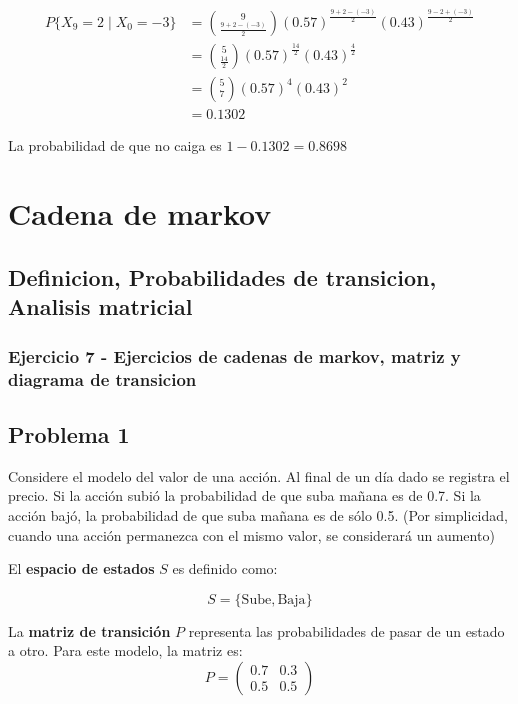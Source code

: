 \documentclass{article}
\begin{document}
\begin{align*}
    P\{X_{9} = 2 \mid X_0 = -3\} & = \binom{9}{\frac{9 + 2 -(-3)}{2}} \left(0.57\right)^{\frac{9 + 2 - (-3)}{2}} \left(0.43\right)^{\frac{9 - 2 + (-3)}{2}} \\
                                 & = \binom{5}{\frac{14}{2}} \left(0.57\right)^{\frac{14}{2}} \left(0.43\right)^{\frac{4}{2}}                               \\
                                 & = \binom{5}{7} \left(0.57\right)^{4} \left(0.43\right)^{2}                                                               \\
                                 & = 0.1302
\end{align*}

La probabilidad de que no caiga es $1-0.1302 = 0.8698$

\newpage

\section{Cadena de markov}

\subsection{Definicion, Probabilidades de transicion, Analisis matricial}

\subsubsection{Ejercicio 7 - Ejercicios de cadenas de markov, matriz y diagrama de transicion}

\subsection*{Problema 1}

Considere el modelo del valor de una acción. Al final de un día dado se registra el precio. Si la acción subió la probabilidad de que suba mañana es de 0.7. Si la acción bajó, la probabilidad de que suba mañana es de sólo 0.5. (Por simplicidad, cuando una acción permanezca con el mismo valor, se considerará un aumento)

El \textbf{espacio de estados} \( S \) es definido como:

\[ S = \{ \text{Sube}, \text{Baja} \} \]

La \textbf{matriz de transición} \( P \) representa las probabilidades de pasar de un estado a otro. Para este modelo, la matriz es:
\[ P = \begin{pmatrix} 0.7 & 0.3 \\ 0.5 & 0.5 \end{pmatrix} \]
\end{document}
